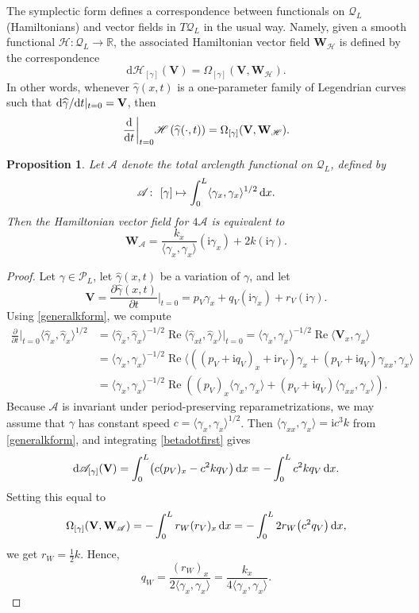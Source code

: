 \documentclass[10pt,a4paper]{amsart}
\newcommand\Leg{ {\mathcal P}} %
\newcommand\Legq{\mathcal Q}
\newcommand\kk{k} %
\def\ri{\mathrm{i}}
\newcommand\VV{\mathbf V}
\newcommand\VW{\mathbf W}
\newcommand\funH{{\mathscr H}} %
\newcommand\funA{{\mathscr A}} %
\newcommand{\dx}{\,{\rm d}x}
\def\gam{\gamma} %
\def\di{\partial}
\def\R{\mathbb R}
\newcommand\gamf{\widehat{\gam}} %
\newcommand\bert{\big\vert}
\newcommand\rd{\mathrm{d}}
\renewcommand\Re{\operatorname{Re}}
\numberwithin{equation}{section}
\newtheorem{Proposition}[Theorem]{Proposition}
 { \theoremstyle{definition}
\newtheorem{Definition}[Theorem]{Definition}
\newtheorem{Note}[Theorem]{Note}
\newtheorem{Example}[Theorem]{Example}
\newtheorem{Remark}[Theorem]{Remark} }
\begin{document}
The symplectic form defines a correspondence between functionals on
$\Legq_L$ (Hamiltonians) and vector fields in $T \Legq_L$ in the usual way. Namely, given a smooth functional $\funH\colon \Legq_L \to \R$, the associated Hamiltonian vector field $\VW_\funH$ is defined by the correspondence
\[
\rd \funH_{[\gamma]} (\VV)=\Omega_{[\gamma]}(\VV, \VW_\funH).
\]
In other words, whenever $\gamf(x,t)$ is a one-parameter family of Legendrian curves such that ${\rm d}\gamf/{\rm d}t\vert_{t=0} = \VV$, then
\[\dfrac{{\rm d}}{{\rm d}t}\bigg\vert_{t=0} \funH \left( \gamf(\cdot, t)\right) = \Omega_{[\gamma]}(\VV, \VW_\funH).\]

\begin{Proposition}\label{hamlength} Let $\funA$ denote the total arclength functional on $\Legq_L$, defined by
\[\funA\colon \ [\gam] \mapsto \int_0^L \langle \gam_x ,\gam_x \rangle^{1/2} \dx.\]
Then the Hamiltonian vector field for $4\funA$ is equivalent to
\[
\VW_\funA=\dfrac{ \kk_x}{\langle \gam_x, \gam_x\rangle} (\ri \gam_x) + 2 \kk(\ri \gam).
\]
\end{Proposition}

\begin{proof}
Let $\gam \in \Leg_L$, let $\gamf(x,t)$ be a variation of $\gam$, and let
\begin{equation}\label{VVdef}
\VV = \dfrac{\di \gamf(x,t)}{\di t}\Big|_{t=0} = p_V\gam_x + q_V (\ri\gam_x) + r_V (\ri \gam).
\end{equation}
Using \eqref{generalkform}, we compute
\begin{align}
\frac{\di }{\di t}\bigg|_{t=0} \bigl\langle \gamf_x , \gamf_x \bigr\rangle^{1/2}
& =\bigl\langle \gamf_x , \gamf_x \bigr\rangle^{-1/2} \Re \bigl\langle \gamf_{xt} , \gamf_x \bigr\rangle \bert_{t=0}
= \langle \gam_x, \gam_x \rangle^{-1/2} \Re\langle \VV_x, \gam_x \rangle \nonumber\\[-3pt]
&=\langle \gam_x, \gam_x \rangle^{-1/2} \Re\langle \left((p_V+\ri q_V)_x + \ri r_V\right) \gam_x + (p_V +\ri q_V) \gam_{xx}, \gam_x\rangle \nonumber\\
&=\langle \gam_x, \gam_x \rangle^{-1/2}\Re\left( (p_V)_x \langle \gam_x, \gam_x \rangle + (p_V +\ri q_V) \langle \gam_{xx}, \gam_x\rangle \right).
\label{betadotfirst}
\end{align}
Because $\funA$ is invariant under period-preserving reparametrizations, we may assume that $\gam$ has constant speed $c=\langle \gam_x, \gam_x \rangle^{1/2}$.
Then $\langle \gam_{xx}, \gam_x\rangle = \ri c^3 \kk$ from \eqref{generalkform}, and integrating \eqref{betadotfirst} gives
\[
\rd \funA_{[\gamma]} (\VV) = \int_0^L \bigl(c (p_V)_x -c^2 \kk q_V\bigr)\dx=-\int_0^L c^2 \kk q_V \dx.
\]
Setting this equal to
\[
\Omega_{[\gamma]}(\VV, \VW_\funA)=-\int_0^L r_W (r_V)_x \, {\rm d}x=-\int_0^L 2 r_W \bigl(c^2q_V \bigr)\, {\rm d}x,
\] we get
$r_W=\tfrac12 \kk$. Hence,
\[
q_W = \frac{(r_W)_x}{2 \langle \gam_x, \gam_x\rangle} = \frac{\kk_x}{4 \langle \gam_x, \gam_x\rangle}.\tag*{\qed}
\]\renewcommand{\qed}{}
\end{proof}
\end{document}
